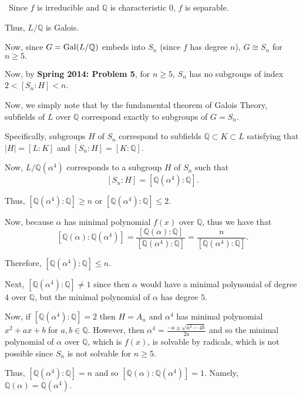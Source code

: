 \documentclass[12pt]{Qual}
\begin{document}
\begin{solution}$\,$
Since $f$ is irreducible and $\mathbb{Q}$ is characteristic $0$, $f$ is separable.

Thus, $L/\mathbb{Q}$ is Galois.

Now, since $G=\text{Gal}(L/\mathbb{Q})$ embeds into $S_n$ (since $f$ has degree $n$), $G\cong S_n$ for $n\ge 5.$

Now, by \textbf{Spring 2014: Problem 5}, for $n\ge 5$, $S_n$ has no subgroups of index $2<[S_n:H]<n$.

Now, we simply note that by the fundamental theorem of Galois Theory, subfields of $L$ over $\mathbb{Q}$ correspond exactly to subgroups of $G=S_n.$

Specifically, subgroups $H$ of $S_n$ correspond to subfields $\mathbb{Q}\subset K\subset L$ satisfying that $|H|=[L:K]$ and $[S_n:H]=[K:\mathbb{Q}].$

Now, $L/\mathbb{Q}(\alpha^4)$ corresponds to a subgroup $H$ of $S_n$ such that $$[S_n:H]=[\mathbb{Q}(\alpha^4):\mathbb{Q}].$$

Thus, $[\mathbb{Q}(\alpha^4):\mathbb{Q}]\ge n$ or $[\mathbb{Q}(\alpha^4):\mathbb{Q}]\le 2$.

Now, because $\alpha$ has minimal polynomial $f(x)$ over $\mathbb{Q}$, thus we have that $$[\mathbb{Q}(\alpha):\mathbb{Q}(\alpha^4)]=\frac{[\mathbb{Q}(\alpha):\mathbb{Q}]}{[\mathbb{Q}(\alpha^4):\mathbb{Q}]}=\frac{n}{[\mathbb{Q}(\alpha^4):\mathbb{Q}]}.$$

Therefore, $[\mathbb{Q}(\alpha^4):\mathbb{Q}]\le n$.

Next, $[\mathbb{Q}(\alpha^4):\mathbb{Q}]\not=1$ since then $\alpha$ would have a minimal polynomial of degree $4$ over $\mathbb{Q}$, but the minimal polynomial of $\alpha$ has degree $5.$

Now, if $[\mathbb{Q}(\alpha^4):\mathbb{Q}]=2$ then $H=A_n$ and $\alpha^4$ has minimal polynomial $x^2+ax+b$ for $a,b\in\mathbb{Q}$. However, then $\alpha^4=\frac{-a\pm\sqrt{a^2-4b}}{2a}$ and so the minimal polynomial of $\alpha$ over $\mathbb{Q}$, which is $f(x)$, is solvable by radicals, which is not possible since $S_n$ is not solvable for $n\ge 5.$

Thus, $[\mathbb{Q}(\alpha^4):\mathbb{Q}]=n$ and so $[\mathbb{Q}(\alpha):\mathbb{Q}(\alpha^4)]=1.$ Namely, $\mathbb{Q}(\alpha)=\mathbb{Q}(\alpha^4).$
\end{solution}
\end{document}
